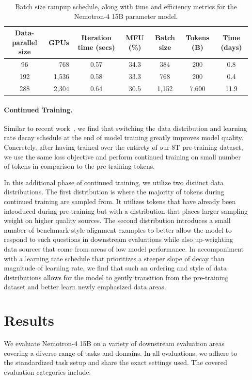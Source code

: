 \documentclass[11pt]{article}
\newcommand{\ours}{Nemotron-4}
\begin{document}
\begin{table}[H]
    \centering
    \begin{tabular}{crccccc}
    \toprule
    Data-parallel size & GPUs & Iteration time (secs) & MFU (\%) & Batch size & Tokens (B) & Time (days) \\
    \toprule
    96 &  768 & 0.57 & 34.3 & 384 &  200 & 0.8 \\
    192 & 1,536 & 0.58 & 33.3 & 768 &  200 & 0.4 \\
    288 & 2,304 & 0.64 & 30.5 & 1,152 &  7,600 & 11.9   \\
    \bottomrule
    \end{tabular}
    \caption{Batch size rampup schedule, along with time and efficiency metrics for the \ours{} 15B parameter model.}
    \label{tab:43bmodel_batch_time_mfu}
\end{table}

\paragraph{Continued Training.}
Similar to recent work~\citep{geminiteam2023gemini}, we find that switching the data distribution and learning rate decay schedule at the end of model training greatly improves model quality. Concretely, after having trained over the entirety of our 8T pre-training dataset, we use the same loss objective and perform continued training on small number of tokens in comparison to the pre-training tokens. 

In this additional phase of continued training, we utilize two distinct data distributions. 
The first distribution is where the majority of tokens during continued training are sampled from. It utilizes tokens that have already been introduced during pre-training but with a distribution that places larger sampling weight on higher quality sources. 
The second distribution introduces a small number of benchmark-style alignment examples to better allow the model to respond to such questions in downstream evaluations while also up-weighting data sources that come from areas of low model performance. 
In accompaniment with a learning rate schedule that prioritizes a steeper slope of decay than magnitude of learning rate, we find that such an ordering and style of data distributions allows for the model to gently transition from the pre-training dataset and better learn newly emphasized data areas. 

\section{Results}\label{results}
We evaluate \ours{} 15B on a variety of downstream evaluation areas covering a diverse range of tasks and domains. In all evaluations, we adhere to the standardized task setup and share the exact settings used. The covered evaluation categories include: 
\end{document}
